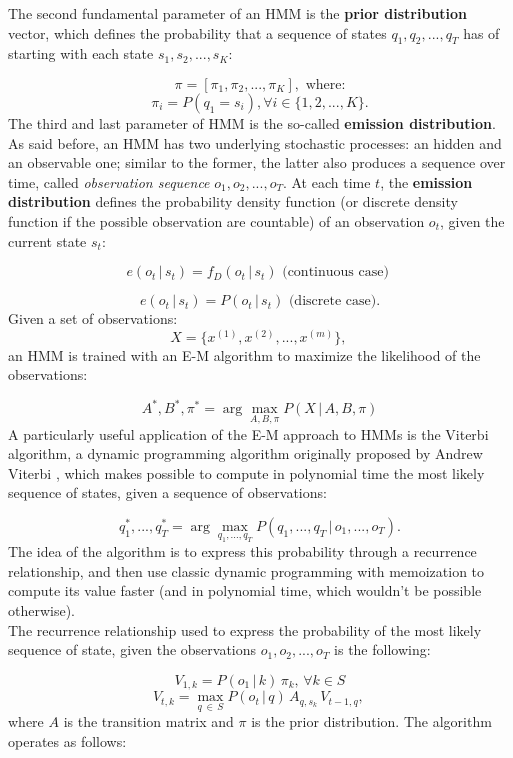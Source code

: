 



The second fundamental parameter of an HMM is the \textbf{prior distribution} vector, which defines the probability that a sequence of states $q_1, q_2, ..., q_T$ has of starting with each state $s_1, s_2, ..., s_K$:

$$\pi = [\pi_1, \pi_2, ..., \pi_K], \text{ where:}$$
$$\pi_i = P(q_1 = s_i), \forall i \in \{1, 2, ..., K\}.$$
The third and last parameter of HMM is the so-called \textbf{emission distribution}. As said before, an HMM has two underlying stochastic processes: an hidden and an observable one; similar to the former, the latter also produces a sequence over time, called \textit{observation sequence} $o_1, o_2, ..., o_T$.
At each time $t$, the \textbf{emission distribution} defines the probability density function (or discrete density function if the possible observation are countable) of an observation $o_t$, given the current state $s_t$:

$$e(o_t \, | \, s_t) = f_D(o_t \, | \, s_t) \text{ (continuous case) } $$

$$e(o_t \, | \, s_t) = P(o_t \, | \, s_t) \text{ (discrete case).} $$
Given a set of observations:
$$X = \{x^{(1)}, x^{(2)}, ..., x^{(m)}\}\text{, }$$
an HMM is trained with an E-M algorithm to maximize the likelihood of the observations:

$$A^*, B^*, \pi^* = \arg \max_{A, B, \pi} P(X \, | \, A, B, \pi)$$
A particularly useful application of the E-M approach to HMMs is the Viterbi algorithm, a dynamic programming algorithm originally proposed by Andrew Viterbi \cite{viterbi}, which makes possible to compute in polynomial time the most likely sequence of states, given a sequence of observations:

$$q^*_1, ..., q^*_T = \arg \max_{q_1, ..., q_T} P(q_1, ..., q_T \, | \, o_1, ..., o_T)\text{.}$$
The idea of the algorithm is to express this probability through a recurrence relationship, and then use classic dynamic programming with memoization to compute its value faster (and in polynomial time, which wouldn't be possible otherwise).
\\The recurrence relationship used to express the probability of the most likely sequence of state, given the observations $o_1, o_2, ..., o_T$ is the following:

$$V_{1, k} = P(o_1 \, | \, k) \, \pi_k, \, \forall k \in S$$
$$V_{t, k} = \max_{q \, \in \, S} P(o_t \, | \, q) \, A_{q, s_k} \, V_{t-1, q} \text{, }$$
where $A$ is the transition matrix and $\pi$ is the prior distribution. The algorithm operates as follows:

